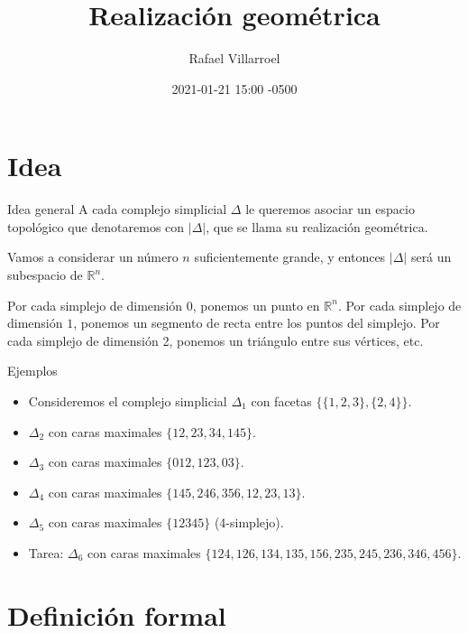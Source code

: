 \documentclass[spanish, presentation]{beamer}
\author{Rafael Villarroel}
\date{2021-01-21 15:00 -0500}
\title{Realización geométrica}
\begin{document}
\maketitle
{}

\section{Idea}
\label{sec:org6f4050b}

\begin{frame}[label={sec:org1d6b0b0}]{Idea general}
A cada complejo simplicial \(\Delta\) le queremos asociar un espacio topológico que denotaremos con \(|\Delta|\), que se llama su \alert{realización geométrica}.

Vamos a considerar un número \(n\) suficientemente grande, y entonces \(|\Delta|\) será un subespacio de \(\mathbb{R}^{n}\).

Por cada simplejo de dimensión 0, ponemos un punto en \(\mathbb{R}^{n}\). Por cada simplejo de dimensión \(1\), ponemos un segmento de recta entre los puntos del simplejo. Por cada simplejo de dimensión 2, ponemos un triángulo entre sus vértices, etc. 
\end{frame}

\begin{frame}[label={sec:orgf7bb8fe}]{Ejemplos}
\begin{itemize}
\item Consideremos el complejo simplicial \(\Delta_{1}\) con facetas \(\{\{1,2,3\},\{2,4\}\}\).
\item \(\Delta_{2}\) con caras maximales \(\{12,23,34,145\}\).
\item \(\Delta_{3}\) con caras maximales \(\{012,123,03\}\).
\item \(\Delta_{4}\) con caras maximales \(\{145,246,356,12,23,13\}\).
\item \(\Delta_{5}\) con caras maximales \(\{12345\}\) (4-simplejo).
\item \alert{Tarea:} \(\Delta_{6}\) con caras maximales \(\{124,126,134,135,156,235,245,236,346,456\}\).
\end{itemize}
\end{frame}

\section{Definición formal}
\label{sec:org7c1d3f6}
\end{document}
